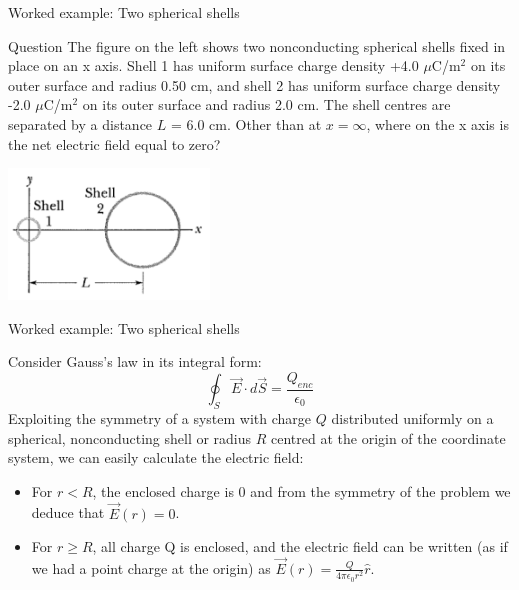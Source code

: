 {
\problemslide

%
%
%

\begin{frame}{Worked example: Two spherical shells}

  \begin{blockexmplque}{Question}
    The figure on the left shows
    two nonconducting spherical shells fixed in place on an x axis.
    Shell 1 has uniform surface charge density +4.0 $\mu$C/m$^{2}$
    on its outer surface and radius 0.50 cm, and
    shell 2 has uniform surface charge density -2.0 $\mu$C/m$^{2}$
    on its outer surface and radius 2.0 cm. The shell centres are separated
    by a distance $L$ = 6.0 cm.
    Other than at $x = \infty$,
    where on the x axis is the net electric field equal to zero?
    \begin{center}
      \includegraphics[width=0.40\textwidth]{./images/problems/lect02_2_charged_spherical_shells}
    \end{center}
  \end{blockexmplque}

\end{frame}

%
%
%

\begin{frame}{Worked example: Two spherical shells}

  Consider Gauss's law in its integral form:
  \begin{equation*}
  	 \oint_{S} \vec{E} \cdot d\vec{S} = \frac{Q_{enc}}{\epsilon_0}
  \end{equation*}
  Exploiting the symmetry of a system with charge $Q$ distributed
  uniformly on a spherical, nonconducting shell or radius $R$
  centred at the origin of the coordinate system,
  we can easily calculate the electric field:
  \begin{itemize}
  \item
  For $r < R$, the enclosed charge is 0 and from the symmetry of the problem we
  deduce that $\vec{E}(r) = 0$.
  \item
  For $r \ge R$, all charge Q is enclosed, and the electric field can
  be written (as if we had a point charge at the origin)
  as $\vec{E}(r) = \frac{Q}{4\pi\epsilon_0 r^2} \hat{r}$.\\
  \end{itemize}


\end{frame}}
